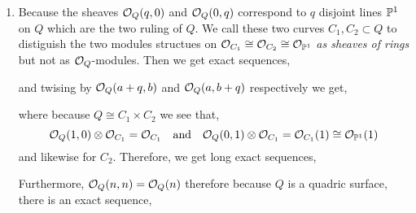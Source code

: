 \documentclass[12pt]{article}
\begin{document}
\begin{enumerate}
\item Because the sheaves $\struct{Q}(q,0)$ and $\struct{Q}(0,q)$ correspond to $q$ disjoint lines $\P^1$ on $Q$ which are the two ruling of $Q$. We call these two curves $C_1, C_2 \subset Q$ to distiguish the two modules structues on $\struct{C_1} \cong \struct{C_2} \cong \struct{\P^1}$ \textit{as sheaves of rings} but not as $\struct{Q}$-modules. Then we get exact sequences,
\begin{center}
\end{center}
and twising by $\struct{Q}(a+q,b)$ and $\struct{Q}(a,b+q)$ respectively we get,
\begin{center}
\end{center}
where because $Q \cong C_1 \times C_2$ we see that,
\[ \struct{Q}(1,0) \otimes \struct{C_1} = \struct{C_1} \quad \text{and} \quad \struct{Q}(0,1) \ot \struct{C_1} = \struct{C_1}(1) \cong \struct{\P^1}(1) \]
and likewise for $C_2$. Therefore, we get long exact sequences,
\begin{center}
\end{center}
Furthermore, $\struct{Q}(n,n) = \struct{Q}(n)$ therefore because $Q$ is a quadric surface, there is an exact sequence,
\begin{center}
\end{center}
\end{enumerate}
\end{document}
